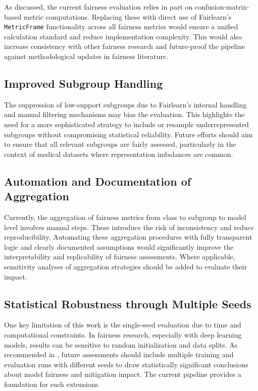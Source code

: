 \documentclass[12pt, a4paper, oneside]{book}   	%
\begin{document}
	As discussed, the current fairness evaluation relies in part on confusion-matrix-based metric computations. Replacing these with direct use of \gls{Fairlearn}’s \texttt{MetricFrame} functionality across all fairness metrics would ensure a unified calculation standard and reduce implementation complexity. This would also increase consistency with other fairness research and future-proof the pipeline against methodological updates in fairness literature.
	
	\subsection{Improved Subgroup Handling}
	
	The suppression of low-support subgroups due to \gls{Fairlearn}’s internal handling and manual filtering mechanisms may bias the evaluation. This highlights the need for a more sophisticated strategy to include or resample underrepresented subgroups without compromising statistical reliability. Future efforts should aim to ensure that all relevant subgroups are fairly assessed, particularly in the context of medical datasets where representation imbalances are common.
	
	\subsection{Automation and Documentation of Aggregation}
	
	Currently, the aggregation of fairness metrics from class to subgroup to model level involves manual steps. These introduce the risk of inconsistency and reduce reproducibility. Automating these aggregation procedures with fully transparent logic and clearly documented assumptions would significantly improve the interpretability and replicability of fairness assessments. Where applicable, sensitivity analyses of aggregation strategies should be added to evaluate their impact.
	
	\subsection{Statistical Robustness through Multiple Seeds}
	
	One key limitation of this work is the single-seed evaluation due to time and computational constraints. In fairness research, especially with deep learning models, results can be sensitive to random initialization and data splits. As recommended in \textcite{Valentim_2019}, future assessments should include multiple training and evaluation runs with different seeds to draw statistically significant conclusions about model fairness and mitigation impact. The current pipeline provides a foundation for such extensions.
	
\end{document}
